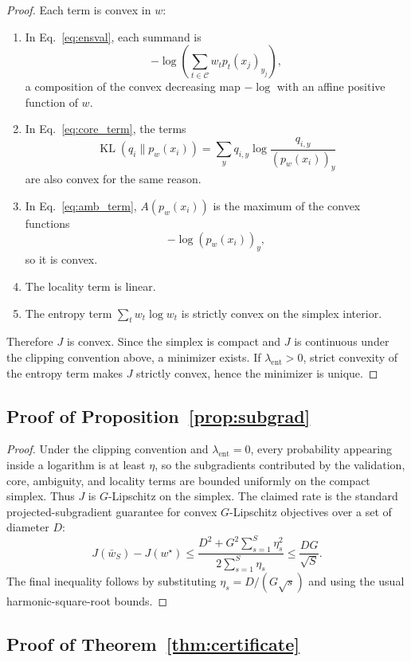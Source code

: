 \documentclass{article}
\newcommand{\cC}{\mathcal{C}}
\newcommand{\KL}{\operatorname{KL}}
\begin{document}
\begin{proof}
Each term is convex in $w$:
\begin{enumerate}[leftmargin=1.4em]
    \item In Eq.~\eqref{eq:ensval}, each summand is
    \[
        -\log\!\left(\sum_{t\in\cC} w_t p_t(x_j)_{y_j}\right),
    \]
    a composition of the convex decreasing map $-\log$ with an affine positive function of $w$.
    \item In Eq.~\eqref{eq:core_term}, the terms
    \[
        \KL(q_i\|p_w(x_i))
        =
        \sum_y q_{i,y}\log \frac{q_{i,y}}{(p_w(x_i))_y}
    \]
    are also convex for the same reason.
    \item In Eq.~\eqref{eq:amb_term}, $A(p_w(x_i))$ is the maximum of the convex functions
    \[
        -\log (p_w(x_i))_y,
    \]
    so it is convex.
    \item The locality term is linear.
    \item The entropy term $\sum_t w_t\log w_t$ is strictly convex on the simplex interior.
\end{enumerate}
Therefore $J$ is convex. Since the simplex is compact and $J$ is continuous under the clipping convention above, a minimizer exists. If $\lambda_{\mathrm{ent}}>0$, strict convexity of the entropy term makes $J$ strictly convex, hence the minimizer is unique.
\end{proof}

\subsection{Proof of Proposition~\ref{prop:subgrad}}

\begin{proof}
Under the clipping convention and $\lambda_{\mathrm{ent}}=0$, every probability appearing inside a logarithm is at least $\eta$, so the subgradients contributed by the validation, core, ambiguity, and locality terms are bounded uniformly on the compact simplex. Thus $J$ is $G$-Lipschitz on the simplex. The claimed rate is the standard projected-subgradient guarantee for convex $G$-Lipschitz objectives over a set of diameter $D$:
\[
    J(\bar w_S)-J(w^\star)
    \le
    \frac{D^2 + G^2\sum_{s=1}^{S}\eta_s^2}{2\sum_{s=1}^{S}\eta_s}
    \le
    \frac{DG}{\sqrt{S}}.
\]
The final inequality follows by substituting $\eta_s = D/(G\sqrt{s})$ and using the usual harmonic-square-root bounds.
\end{proof}

\subsection{Proof of Theorem~\ref{thm:certificate}}
\end{document}

